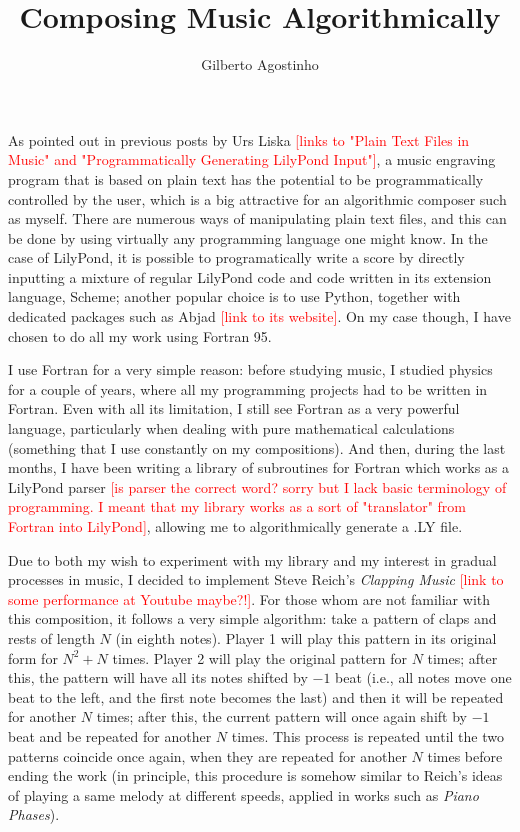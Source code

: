 \documentclass{article}
\begin{document}
\title{Composing Music Algorithmically}
\author{Gilberto Agostinho}
\date{}
\maketitle

As pointed out in previous posts by Urs Liska \textcolor{red}{[links to "Plain Text Files in Music" and
"Programmatically Generating LilyPond Input"]}, a music engraving program that is based on plain text has
the potential to be programmatically controlled by the user, which is a big attractive for an algorithmic
composer such as myself. 
There are numerous ways of manipulating plain text files, and this can be done by using virtually any
programming language one might know. 
In the case of LilyPond, it is possible to programatically write a score by directly inputting a mixture
of regular LilyPond code and code written in its extension language, Scheme; another popular choice is to
use Python, together with dedicated packages such as Abjad \textcolor{red}{[link to its website]}. 
On my case though, I have chosen to do all my work using Fortran 95.

I use Fortran for a very simple reason: before studying music, I studied physics for a couple of years,
where all my programming projects had to be written in Fortran. 
Even with all its limitation, I still see Fortran as a very powerful language, particularly when dealing
with pure mathematical calculations (something that I use constantly on my compositions). 
And then, during the last months, I have been writing a library of subroutines for Fortran which works as
a LilyPond parser 
\textcolor{red}{[is parser the correct word? sorry but I lack basic terminology of programming.
I meant that my library works as a sort of "translator" from Fortran into LilyPond]}, allowing me to
algorithmically generate a .LY file.

Due to both my wish to experiment with my library and my interest in gradual processes in music,
I decided to implement Steve Reich's \textit{Clapping Music} \textcolor{red}{[link to some performance
at Youtube maybe?!]}. 
For those whom are not familiar with this composition, it follows a very simple algorithm: take a pattern
of claps and rests of length $N$ (in eighth notes). 
Player 1 will play this pattern in its original form for $N^2+N$ times. 
Player 2 will play the original pattern for $N$ times; after this, the pattern will have all its notes
shifted by $-1$ beat (i.e., all notes move one beat to the left, and the first note becomes the last)
and then it will be repeated for another $N$ times; 
after this, the current pattern will once again shift by $-1$ beat and be repeated for another $N$ times. 
This process is repeated until the two patterns coincide once again, when they are repeated for another $N$
times before ending the work (in principle, this procedure is somehow similar to Reich's ideas of playing a
same melody at different speeds, applied in works such as \textit{Piano Phases}).
\end{document}
